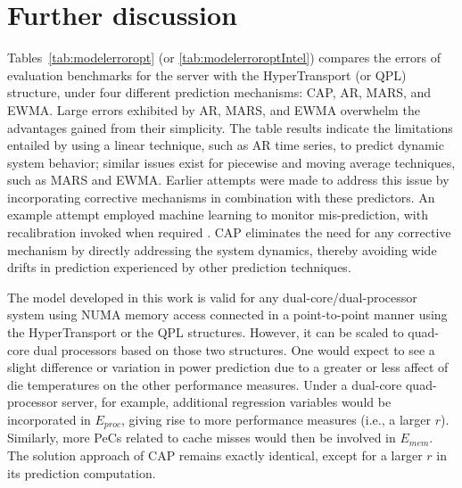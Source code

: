 \section{Further discussion}
\label{sec:caseanalysis}
Tables~\ref{tab:modelerroropt} (or \ref{tab:modelerroroptIntel})
compares the errors of evaluation benchmarks for the server with the
HyperTransport (or QPL) structure, under four different prediction
mechanisms: CAP, AR, MARS, and EWMA. Large errors exhibited by AR,
MARS, and EWMA overwhelm the advantages gained from their simplicity.
The table results indicate the limitations entailed by using a linear
technique, such as AR time series, to predict dynamic system behavior;
similar issues exist for piecewise and moving average techniques, such as
MARS and EWMA.  Earlier attempts were made to address this issue by
incorporating corrective mechanisms in combination with these
predictors.  An example attempt employed machine learning to monitor 
mis-prediction, with recalibration invoked when required
\cite{Coskun2008}.  CAP eliminates the need for any corrective mechanism
by directly addressing the system dynamics, thereby avoiding wide drifts in
prediction experienced by other prediction techniques.

The model developed in this work is valid for any
dual-core/dual-processor system using NUMA memory access connected in a
point-to-point manner using the HyperTransport or the QPL structures.
However, it can be scaled to quad-core dual processors based on those
two structures.  One would expect to see a slight difference or
variation in power prediction due to a greater or less affect of die
temperatures on the other performance measures.  Under a dual-core
quad-processor server, for example, additional regression variables
would be incorporated in $E_{proc}$, giving rise to more performance
measures (i.e., a larger $r$).  Similarly, more PeCs related to cache
misses would then be involved in $E_{mem}$.  The solution approach of
CAP remains exactly identical, except for a larger $r$ in its prediction
computation.

